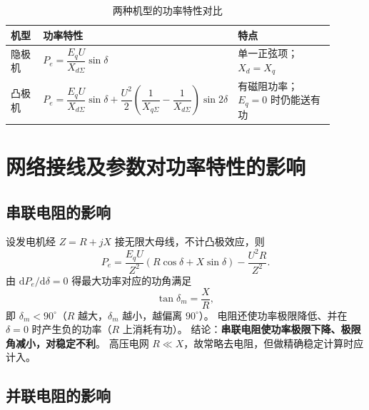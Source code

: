 \begin{table}[htbp]
  \centering
  \caption{两种机型的功率特性对比}
  \small
  \begin{tabular}{@{}p{0.12\linewidth}p{0.40\linewidth}p{0.38\linewidth}@{}}
    \toprule
    机型 & 功率特性 & 特点 \\
    \midrule
    隐极机 & $P_e=\dfrac{E_qU}{X_{d\Sigma}}\sin\delta$ & 单一正弦项；$X_d=X_q$ \\
    凸极机 & $P_e=\dfrac{E_qU}{X_{d\Sigma}}\sin\delta
      +\dfrac{U^{2}}{2}\left(\dfrac{1}{X_{q\Sigma}}-\dfrac{1}{X_{d\Sigma}}\right)\sin2\delta$
      & 有磁阻功率；$E_q=0$ 时仍能送有功 \\
    \bottomrule
  \end{tabular}
\end{table}


\section{网络接线及参数对功率特性的影响}

\subsection{串联电阻的影响}

设发电机经 $Z=R+jX$ 接无限大母线，不计凸极效应，则
\begin{equation}
  P_e=\frac{E_qU}{Z^{2}}\left(R\cos\delta+X\sin\delta\right)-\frac{U^{2}R}{Z^{2}} .
\end{equation}
由 $\mathrm{d}P_e/\mathrm{d}\delta=0$ 得最大功率对应的功角满足
\begin{equation}
  \tan\delta_m=\frac{X}{R},
\end{equation}
即 $\delta_m<90^\circ$（$R$ 越大，$\delta_m$ 越小，越偏离 $90^\circ$）。
电阻还使功率极限降低、并在 $\delta=0$ 时产生负的功率（$R$ 上消耗有功）。
结论：\textbf{串联电阻使功率极限下降、极限角减小，对稳定不利}。
高压电网 $R\ll X$，故常略去电阻，但做精确稳定计算时应计入。

\subsection{并联电阻的影响}

